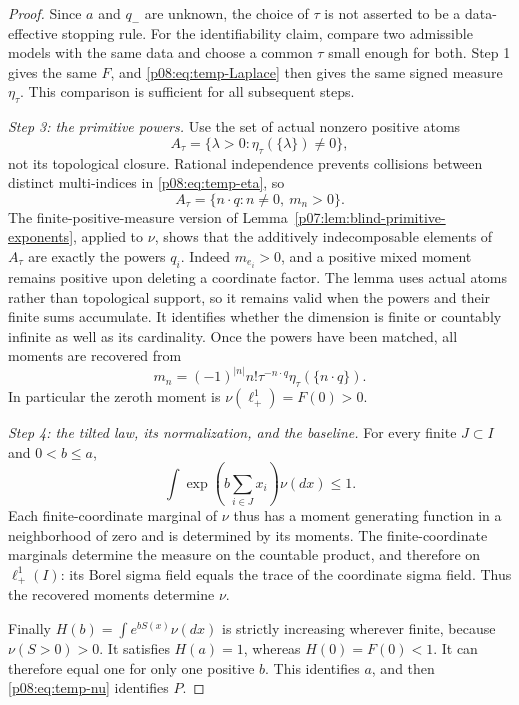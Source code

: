 \documentclass[11pt,letterpaper]{article}
\theoremstyle{definition}
\theoremstyle{remark}
\newcommand{\1}{\mathbf 1}
\begin{document}
\begin{proof}
Since $a$ and $q_-$ are unknown, the choice of $\tau$ is not asserted
to be a data-effective stopping rule. For the identifiability claim,
compare two admissible models with the same data and choose a common
$\tau$ small enough for both. Step 1 gives the same $F$, and
\eqref{p08:eq:temp-Laplace} then gives the same signed measure
$\eta_\tau$. This comparison is sufficient for all subsequent steps.

\emph{Step 3: the primitive powers.}
Use the set of actual nonzero positive atoms
\[
          A_\tau=\{\lambda>0:\eta_\tau(\{\lambda\})\ne0\},
\]
not its topological closure. Rational independence prevents collisions
between distinct multi-indices in \eqref{p08:eq:temp-eta}, so
\[
 A_\tau=\{n\cdot q:n\ne0,\ m_n>0\}.
\]
The finite-positive-measure version of
Lemma~\ref{p07:lem:blind-primitive-exponents}, applied to $\nu$, shows that
the additively indecomposable elements of $A_\tau$ are exactly the powers
$q_i$. Indeed $m_{e_i}>0$, and a positive mixed moment remains positive
upon deleting a coordinate factor. The lemma uses actual atoms rather
than topological support, so it remains valid when the powers and their
finite sums accumulate. It identifies whether the dimension is finite
or countably infinite as well as its cardinality.
Once the powers have been matched, all moments are
recovered from
\begin{equation}\label{p08:eq:temp-coefficients}
       m_n=(-1)^{|n|}n!\tau^{-n\cdot q}
                         \eta_\tau(\{n\cdot q\}).
\end{equation}
In particular the zeroth moment is $\nu(\ell^1_+)=F(0)>0$.

\emph{Step 4: the tilted law, its normalization, and the baseline.}
For every finite $J\subset I$ and $0<b\leq a$,
\[
       \int\exp\left(b\sum_{i\in J}x_i\right)\nu(dx)\leq1.
\]
Each finite-coordinate marginal of $\nu$ thus has a moment generating
function in a neighborhood of zero and is determined by its moments.
The finite-coordinate marginals determine the measure on the countable
product, and therefore on $\ell^1_+(I)$: its Borel sigma field equals
the trace of the coordinate sigma field. Thus the recovered moments
determine $\nu$.

Finally $H(b)=\int e^{bS(x)}\nu(dx)$ is strictly increasing wherever
finite, because $\nu(S>0)>0$. It satisfies $H(a)=1$, whereas
$H(0)=F(0)<1$. It can therefore equal one for only one positive $b$.
This identifies $a$, and then \eqref{p08:eq:temp-nu} identifies $P$.
\end{proof}
\end{document}
